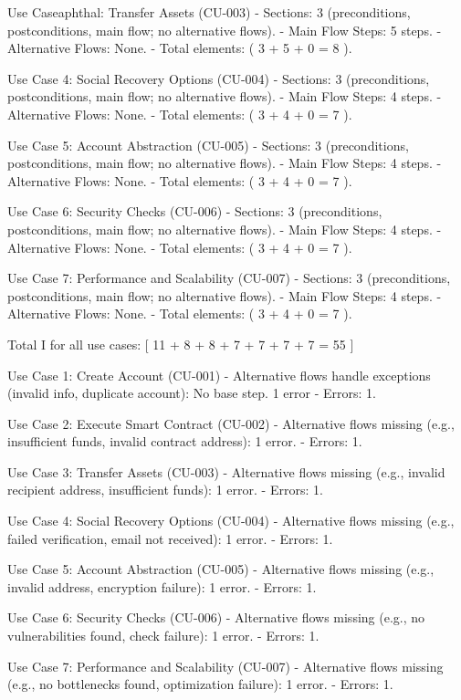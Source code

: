 Use Caseaphthal: Transfer Assets (CU-003)
- Sections: 3 (preconditions, postconditions, main flow; no alternative flows).
- Main Flow Steps: 5 steps.
- Alternative Flows: None.
- Total elements: ( 3 + 5 + 0 = 8 ).

Use Case 4: Social Recovery Options (CU-004)
- Sections: 3 (preconditions, postconditions, main flow; no alternative flows).
- Main Flow Steps: 4 steps.
- Alternative Flows: None.
- Total elements: ( 3 + 4 + 0 = 7 ).

Use Case 5: Account Abstraction (CU-005)
- Sections: 3 (preconditions, postconditions, main flow; no alternative flows).
- Main Flow Steps: 4 steps.
- Alternative Flows: None.
- Total elements: ( 3 + 4 + 0 = 7 ).

Use Case 6: Security Checks (CU-006)
- Sections: 3 (preconditions, postconditions, main flow; no alternative flows).
- Main Flow Steps: 4 steps.
- Alternative Flows: None.
- Total elements: ( 3 + 4 + 0 = 7 ).

Use Case 7: Performance and Scalability (CU-007)
- Sections: 3 (preconditions, postconditions, main flow; no alternative flows).
- Main Flow Steps: 4 steps.
- Alternative Flows: None.
- Total elements: ( 3 + 4 + 0 = 7 ).

Total I for all use cases:
[
11 + 8 + 8 + 7 + 7 + 7 + 7 = 55
]

Use Case 1: Create Account (CU-001)
- Alternative flows handle exceptions (invalid info, duplicate account): No base step. 1 error
- Errors: 1.

Use Case 2: Execute Smart Contract (CU-002)
- Alternative flows missing (e.g., insufficient funds, invalid contract address): 1 error.
- Errors: 1.

Use Case 3: Transfer Assets (CU-003)
- Alternative flows missing (e.g., invalid recipient address, insufficient funds): 1 error.
- Errors: 1.

Use Case 4: Social Recovery Options (CU-004)
- Alternative flows missing (e.g., failed verification, email not received): 1 error.
- Errors: 1.

Use Case 5: Account Abstraction (CU-005)
- Alternative flows missing (e.g., invalid address, encryption failure): 1 error.
- Errors: 1.

Use Case 6: Security Checks (CU-006)
- Alternative flows missing (e.g., no vulnerabilities found, check failure): 1 error.
- Errors: 1.

Use Case 7: Performance and Scalability (CU-007) 
- Alternative flows missing (e.g., no bottlenecks found, optimization failure): 1 error.
- Errors: 1.


